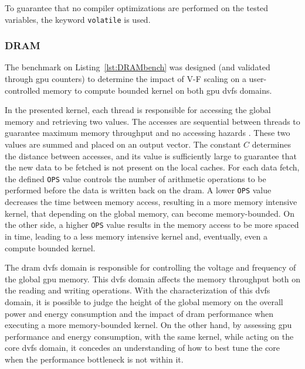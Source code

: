 To guarantee that no compiler optimizations are performed on the tested variables, the keyword \texttt{volatile} is used.


\subsubsection{DRAM}
\label{sec:DRAMbench_exp}

The benchmark on Listing~\ref{lst:DRAMbench} was designed (and validated through \acrshort{gpu} counters) to determine the impact of V-F scaling on a user-controlled memory to compute bounded kernel on both \acrshort{gpu} \acrshort{dvfs} domains. 

In the presented kernel, each thread is responsible for accessing the global memory and retrieving two values. The accesses are sequential between threads to guarantee maximum memory throughput and no accessing hazards
. These two values are summed and placed on an output vector. The constant $C$ determines the distance between accesses, and its value is sufficiently large to guarantee that the new data to be fetched is not present on the local caches.
For each data fetch, the defined \texttt{OPS} value controls the number of arithmetic operations to be performed before the data is written back on the \acrshort{dram}. A lower \texttt{OPS} value decreases the time between memory access, resulting in a more memory intensive kernel, that depending on the global memory, can become memory-bounded. On the other side, a higher \texttt{OPS} value results in the memory access to be more spaced in time, leading to a less memory intensive kernel and, eventually, even a compute bounded kernel.

The \acrshort{dram} \acrshort{dvfs} domain is responsible for controlling the voltage and frequency of the global \acrshort{gpu} memory. This \acrshort{dvfs} domain affects the memory throughput both on the reading and writing operations. With the characterization of this \acrshort{dvfs} domain, it is possible to judge the height of the global memory on the overall power and energy consumption and the impact of \acrshort{dram} performance when executing a more memory-bounded kernel. On the other hand, by assessing \acrshort{gpu} performance and energy consumption, with the same kernel, while acting on the core \acrshort{dvfs} domain, it concedes an understanding of how to best tune the core when the performance bottleneck is not within it.

